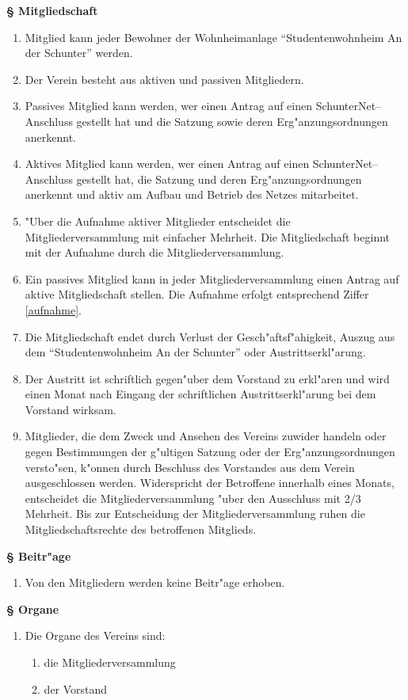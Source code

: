 \documentclass[12pt,titlepage,twoside]{scrartcl}
\newcounter{para_nr}
\newcommand{\Paragraph}[1]{{\large\bf\S{}\sf\textbf{\/\stepcounter{para_nr}\arabic{para_nr} #1}}}
\begin{document}
\begin{appendix}
\Paragraph{Mitgliedschaft}\label{mitglied}
\begin{enumerate}
\item Mitglied kann jeder Bewohner der Wohnheimanlage "`Studentenwohnheim An
  der Schunter"' werden.
\item Der Verein besteht aus aktiven und passiven Mitgliedern.
\item Passives Mitglied kann werden, wer einen Antrag auf einen
  SchunterNet--Anschluss gestellt hat und die Satzung sowie deren
  Erg"anzungsordnungen anerkennt.
\item Aktives Mitglied kann werden, wer einen Antrag auf einen
  SchunterNet--Anschluss gestellt hat, die Satzung und deren
  Erg"anzungsordnungen anerkennt und aktiv am Aufbau und Betrieb des Netzes
  mitarbeitet.
\item \label{aufnahme} "Uber die Aufnahme aktiver Mitglieder entscheidet die
  Mitgliederversammlung mit einfacher Mehrheit. Die Mitgliedschaft beginnt mit
  der Aufnahme durch die Mitgliederversammlung.
\item Ein passives Mitglied kann in jeder Mitgliederversammlung einen Antrag
  auf aktive Mitgliedschaft stellen. Die Aufnahme erfolgt entsprechend
  Ziffer \ref{aufnahme}.
\item Die Mitgliedschaft endet durch Verlust der Gesch"aftsf"ahigkeit, Auszug
  aus dem "`Studentenwohnheim An der Schunter"' oder Austrittserkl"arung.
\item Der Austritt ist schriftlich gegen"uber dem Vorstand zu erkl"aren 
  und wird einen Monat nach Eingang der schriftlichen Austrittserkl"arung bei 
  dem Vorstand wirksam.
\item \label{ausschluss}Mitglieder, die dem Zweck und Ansehen des Vereins
  zuwider handeln oder gegen Bestimmungen der g"ultigen Satzung oder der
  Erg"anzungsordnungen versto"sen, k"onnen durch Beschluss des Vorstandes aus dem
  Verein ausgeschlossen werden. Widerspricht der Betroffene innerhalb eines
  Monats, entscheidet die Mitgliederversammlung "uber den Ausschluss mit 2/3
  Mehrheit. Bis zur Entscheidung der Mitgliederversammlung ruhen die
  Mitgliedschaftsrechte des betroffenen Mitglieds.
\end{enumerate}

\Paragraph{Beitr"age}
\begin{enumerate}
\item[] Von den Mitgliedern werden keine Beitr"age erhoben.
\end{enumerate}

\Paragraph{Organe}
\begin{enumerate}
\item[] Die Organe des Vereins sind:
  \begin{enumerate}
  \item die Mitgliederversammlung
  \item der Vorstand
  \end{enumerate}
\end{enumerate}


\end{appendix}
\end{document}
